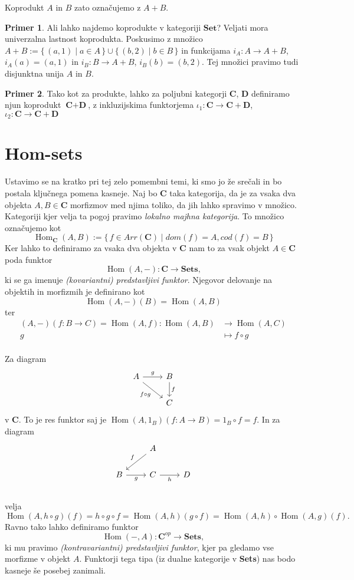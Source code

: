 \documentclass[12pt,a4paper]{book}
\theoremstyle{definition}
\theoremstyle{plain}
\theoremstyle{definition}
\newtheorem{primer}{Primer}[section]
\theoremstyle{remark}
\newcommand{\cat}[1]{\textbf{#1}}
\DeclareMathOperator{\Hom}{Hom}
\renewcommand{\set}[1]{\{\,#1\,\}}
\begin{document}
Koprodukt $A$ in $B$ zato označujemo z $A + B$.
\begin{primer}
Ali lahko najdemo koprodukte v kategoriji $\cat{Set}$? 
Veljati mora univerzalna lastnost koprodukta.
Poskusimo z množico $A+B := \set{(a,1) \mid a \in A} \cup \set{(b,2) \mid b \in B}$ in funkcijama $i_A : A \to A + B$, $i_A(a) = (a,1)$ in $i_B : B \to A+B$, $i_B(b) = (b,2)$. Tej množici pravimo tudi disjunktna unija $A$ in $B$.
\end{primer}

\begin{primer}
Tako kot za produkte, lahko za poljubni kategorji $\cat{C}$, $\cat{D}$ definiramo njun koprodukt $\cat{C} + \cat{D}$, z inkluzijskima funktorjema $\iota_1 : \cat{C} \to \cat{C} + \cat{D}$, $\iota_2 : \cat{C} \to \cat{C} + \cat{D}$
\end{primer}

\section{Hom-sets}
Ustavimo se na kratko pri tej zelo pomembni temi, ki smo jo že srečali in bo postala ključnega pomena kasneje. Naj bo $\cat{C}$ taka kategorija, da je za vsaka dva objekta $A,B \in \cat{C}$ morfizmov med njima toliko, da jih lahko spravimo v množico. Kategoriji kjer velja ta pogoj pravimo \textit{lokalno majhna kategorija}. To množico označujemo kot
$$\Hom_{\cat{C}}(A,B) := \set{f \in Arr(\cat{C}) \mid dom(f) = A, cod(f) = B}$$
Ker lahko to definiramo za vsaka dva objekta v $\cat{C}$ nam to za vsak objekt $A \in \cat{C}$ poda funktor
$$\Hom(A,-) : \cat{C} \to \cat{Sets},$$
ki se ga imenuje \emph{(kovariantni) predstavljivi funktor}. Njegovor delovanje na objektih in morfizmih je definirano kot
$$\Hom(A,-)(B) = \Hom(A,B)$$
ter
\begin{align*}
(A,-)(f : B \to C) = \Hom(A,f): \Hom(A,B) &\to \Hom(A,C) \\
g &\mapsto f \circ g \\
\end{align*}

Za diagram 
$$ \begin{tikzcd}
A \ar[r, "g"] \ar[rd, "f \circ g"'] & B \ar[d, "f"] \\
& C
\end{tikzcd} $$
v $\cat{C}$.
To je res funktor saj je $\Hom(A,1_B)(f:A \to B) = 1_B \circ f = f$. In za diagram 
$$ \begin{tikzcd}
& A \ar[dl, "f"'] & \\
B \ar[r, "g"'] & C \ar[r, "h"'] & D \\
\end{tikzcd} $$
velja
$$
\Hom(A,h \circ g)(f) = h \circ g \circ f = \Hom(A,h)(g \circ f) = \Hom(A,h) \circ \Hom(A,g)(f).
$$
Ravno tako lahko definiramo funktor
$$\Hom(-,A) : \cat{C}^{op} \to \cat{Sets},$$
ki mu pravimo \emph{(kontravariantni) predstavljivi funktor},
kjer pa gledamo vse morfizme v objekt $A$. Funktorji tega tipa (iz dualne kategorije v \cat{Sets}) nas bodo kasneje še posebej zanimali.
\end{document}
